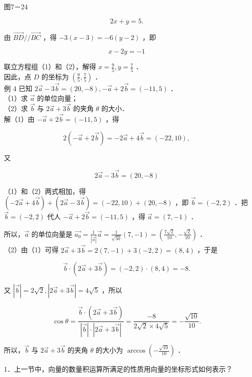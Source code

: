 \documentclass[10pt]{article}
\begin{document}
图7－24

\[
2 x+y=5 .
\]

由 \(\overrightarrow{B D} / / \overrightarrow{B C}\) ，得 \(-3(x-3)=-6(y-2)\) ，即

\[
x-2 y=-1
\]

联立方程组（1）和（2），解得 \(x=\frac{9}{5}, y=\frac{7}{5}\) ．\\
因此，点 \(D\) 的坐标为 \(\left(\frac{9}{5}, \frac{7}{5}\right)\) ．\\
例 4 已知 \(2 \vec{a}-3 \vec{b}=(20,-8),-\vec{a}+2 \vec{b}=(-11,5)\) ．\\
（1）求 \(\vec{a}\) 的单位向量；\\
（2）求 \(\vec{b}\) 与 \(2 \vec{a}+3 \vec{b}\) 的夹角 \(\theta\) 的大小．\\
解（1）由 \(-\vec{a}+2 \vec{b}=(-11,5)\) ，得

\[
2(-\vec{a}+2 \vec{b})=-2 \vec{a}+4 \vec{b}=(-22,10),
\]

又

\[
2 \vec{a}-3 \vec{b}=(20,-8)
\]

（1）和（2）两式相加，得 \((-2 \vec{a}+4 \vec{b})+(2 \vec{a}-3 \vec{b})=(-22,10)+(20,-8)\) ，即 \(\vec{b}=(-2,2)\) ．把 \(\vec{b}=(-2,2)\) 代人 \(-\vec{a}+2 \vec{b}=(-11,5)\) ，得 \(\vec{a}=(7,-1)\) ．

所以，\(\vec{a}\) 的单位向量是 \(\overrightarrow{a_{0}}=\frac{1}{|\vec{a}|} \vec{a}=\frac{1}{\sqrt{50}}(7,-1)=\left(\frac{7 \sqrt{2}}{10},-\frac{\sqrt{2}}{10}\right)\) ．\\
（2）由（1）可得 \(2 \vec{a}+3 \vec{b}=2(7,-1)+3(-2,2)=(8,4)\) ，于是

\[
\vec{b} \cdot(2 \vec{a}+3 \vec{b})=(-2,2) \cdot(8,4)=-8 .
\]

又 \(|\vec{b}|=2 \sqrt{2},|2 \vec{a}+3 \vec{b}|=4 \sqrt{5}\) ，所以

\[
\cos \theta=\frac{\vec{b} \cdot(2 \vec{a}+3 \vec{b})}{|\vec{b}| \cdot|2 \vec{a}+3 \vec{b}|}=\frac{-8}{2 \sqrt{2} \times 4 \sqrt{5}}=-\frac{\sqrt{10}}{10} .
\]

所以，\(\vec{b}\) 与 \(2 \vec{a}+3 \vec{b}\) 的夹角 \(\theta\) 的大小为 \(\arccos \left(-\frac{\sqrt{10}}{10}\right)\) ．

1．上一节中，向量的数量积运算所满足的性质用向量的坐标形式如何表示？
\end{document}
